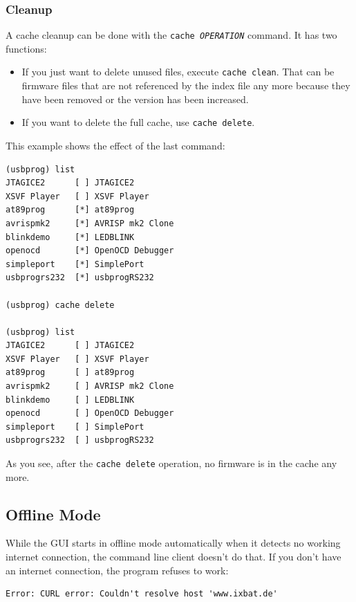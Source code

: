 \documentclass[bibtotoc,UKenglish,halfparskip,oneside,DIV12]{scrreprt}
\begin{document}
\subsubsection{Cleanup}

A cache cleanup can be done with the \texttt{cache \emph{OPERATION}} command. It has two functions:

\begin{itemize}
  \item If you just want to delete unused files, execute \texttt{cache clean}. That can be firmware
    files that are not referenced by the index file any more because they have been removed or the
    version has been increased.

  \item If you want to delete the full cache, use \texttt{cache delete}.
\end{itemize}

This example shows the effect of the last command:

\begin{lstlisting}[style=inline]
(usbprog) list
JTAGICE2      [ ] JTAGICE2
XSVF Player   [ ] XSVF Player
at89prog      [*] at89prog
avrispmk2     [*] AVRISP mk2 Clone
blinkdemo     [*] LEDBLINK
openocd       [*] OpenOCD Debugger
simpleport    [*] SimplePort
usbprogrs232  [*] usbprogRS232

(usbprog) cache delete 

(usbprog) list
JTAGICE2      [ ] JTAGICE2
XSVF Player   [ ] XSVF Player
at89prog      [ ] at89prog
avrispmk2     [ ] AVRISP mk2 Clone
blinkdemo     [ ] LEDBLINK
openocd       [ ] OpenOCD Debugger
simpleport    [ ] SimplePort
usbprogrs232  [ ] usbprogRS232
\end{lstlisting}

As you see, after the \texttt{cache delete} operation, no firmware is in the cache any more.


\subsection{Offline Mode}

While the GUI starts in offline mode automatically when it detects no working internet connection,
the command line client doesn't do that. If you don't have an internet connection, the program
refuses to work:

\begin{lstlisting}[style=inline]
% usbprog
Error: CURL error: Couldn't resolve host 'www.ixbat.de'
\end{lstlisting}
\end{document}
